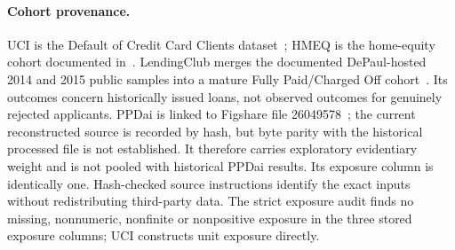 \paragraph{Cohort provenance.}
UCI is the Default of Credit Card Clients dataset~\cite{yeh2016uci}; HMEQ is the home-equity cohort documented in~\cite{baesens2016creditrisk}. LendingClub merges the documented DePaul-hosted 2014 and 2015 public samples into a mature Fully Paid/Charged Off cohort~\cite{depaul2015lendingclub}. Its outcomes concern historically issued loans, not observed outcomes for genuinely rejected applicants. PPDai is linked to Figshare file 26049578~\cite{figshare26049578}; the current reconstructed source is recorded by hash, but byte parity with the historical processed file is not established. It therefore carries exploratory evidentiary weight and is not pooled with historical PPDai results. Its exposure column is identically one. Hash-checked source instructions identify the exact inputs without redistributing third-party data. The strict exposure audit finds no missing, nonnumeric, nonfinite or nonpositive exposure in the three stored exposure columns; UCI constructs unit exposure directly.
